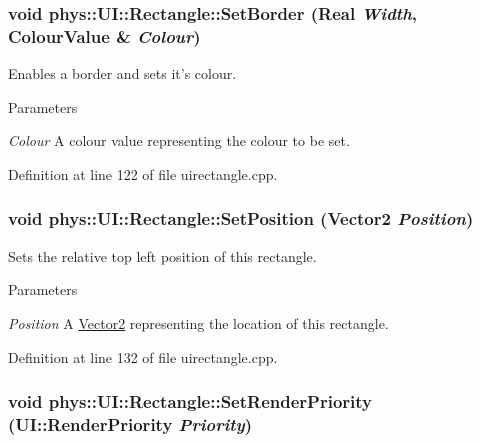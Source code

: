 \hypertarget{classphys_1_1UI_1_1Rectangle_a59903fec0c121da4b4fcdddc3e8488b4}{
\subsubsection[{SetBorder}]{\setlength{\rightskip}{0pt plus 5cm}void phys::UI::Rectangle::SetBorder ({\bf Real} {\em Width}, \/  {\bf ColourValue} \& {\em Colour})}}
\label{d1/d5d/classphys_1_1UI_1_1Rectangle_a59903fec0c121da4b4fcdddc3e8488b4}


Enables a border and sets it's colour. 


\begin{DoxyParams}{Parameters}
\item[{\em Colour}]A colour value representing the colour to be set. \end{DoxyParams}


Definition at line 122 of file uirectangle.cpp.

\hypertarget{classphys_1_1UI_1_1Rectangle_a264cb40ea238d5a4627add4cf55eb8c9}{
\subsubsection[{SetPosition}]{\setlength{\rightskip}{0pt plus 5cm}void phys::UI::Rectangle::SetPosition ({\bf Vector2} {\em Position})}}
\label{d1/d5d/classphys_1_1UI_1_1Rectangle_a264cb40ea238d5a4627add4cf55eb8c9}


Sets the relative top left position of this rectangle. 


\begin{DoxyParams}{Parameters}
\item[{\em Position}]A \hyperlink{classphys_1_1Vector2}{Vector2} representing the location of this rectangle. \end{DoxyParams}


Definition at line 132 of file uirectangle.cpp.

\hypertarget{classphys_1_1UI_1_1Rectangle_a59b281da90012acc64425389f2aea806}{
\subsubsection[{SetRenderPriority}]{\setlength{\rightskip}{0pt plus 5cm}void phys::UI::Rectangle::SetRenderPriority (UI::RenderPriority {\em Priority})}}
\label{d1/d5d/classphys_1_1UI_1_1Rectangle_a59b281da90012acc64425389f2aea806}


